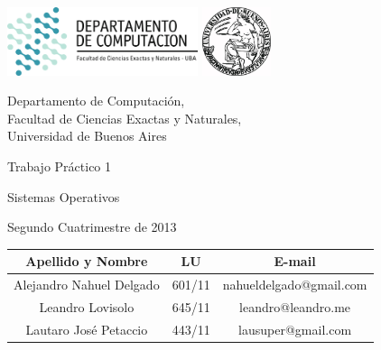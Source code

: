 \documentclass[a4paper,10pt,twoside]{article}
\begin{document}


\thispagestyle{caratula}

\begin{center}

\includegraphics[height=2cm]{DC.png} 
\hfill
\includegraphics[height=2cm]{UBA.jpg} 

\vspace{2cm}

Departamento de Computación,\\
Facultad de Ciencias Exactas y Naturales,\\
Universidad de Buenos Aires

\vspace{4cm}

\begin{Huge}
Trabajo Práctico 1
\end{Huge}

\vspace{0.5cm}

\begin{Large}
Sistemas Operativos
\end{Large}

\vspace{1cm}

Segundo Cuatrimestre de 2013

\vspace{4cm}

\begin{tabular}{|c|c|c|}
\hline
Apellido y Nombre & LU & E-mail\\
\hline
Alejandro Nahuel Delgado & 601/11 & nahueldelgado@gmail.com\\
Leandro Lovisolo      & 645/11 & leandro@leandro.me\\
Lautaro José Petaccio & 443/11 & lausuper@gmail.com\\
\hline
\end{tabular}

\end{center}
\end{document}
